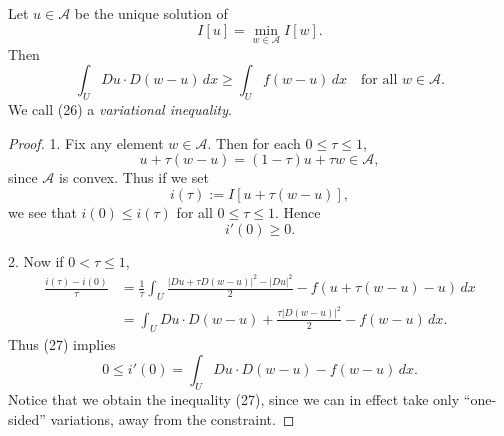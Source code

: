 \begin{theorem}
\label{thm:variational-inequality-characterization}
Let $u \in \mathcal{A}$ be the unique solution of
\[
I[u] = \min_{w \in \mathcal{A}} I[w].
\]
Then
\[
\int_U Du \cdot D(w - u)\, dx \geq \int_U f(w - u)\, dx \quad \text{for all } w \in \mathcal{A}.
\tag{26}
\]
We call (26) a \textit{variational inequality}.
\end{theorem}
\begin{proof}
1. Fix any element $w \in \mathcal{A}$. Then for each $0 \leq \tau \leq 1$,
\[
u + \tau(w - u) = (1 - \tau)u + \tau w \in \mathcal{A},
\]
since $\mathcal{A}$ is convex. Thus if we set
\[
i(\tau) := I[u + \tau(w - u)],
\]
we see that $i(0) \leq i(\tau)$ for all $0 \leq \tau \leq 1$. Hence
\[
i'(0) \geq 0.
\tag{27}
\]

2. Now if $0 < \tau \leq 1$,
\[
\begin{aligned}
\frac{i(\tau) - i(0)}{\tau} &= \frac{1}{\tau} \int_U \frac{|Du + \tau D(w-u)|^2 - |Du|^2}{2} - f(u + \tau(w-u) - u)\, dx \\
&= \int_U Du \cdot D(w-u) + \frac{\tau|D(w-u)|^2}{2} - f(w-u)\, dx.
\end{aligned}
\]
Thus (27) implies
\[
0 \leq i'(0) = \int_U Du \cdot D(w-u) - f(w-u)\, dx.
\]
Notice that we obtain the inequality (27), since we can in effect take only ``one-sided'' variations, away from the constraint.
\end{proof}

